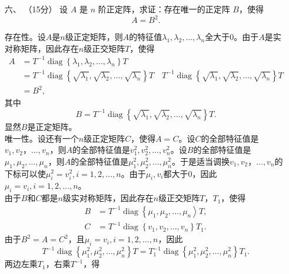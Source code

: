\begin{enumerate}[1~]
\item[六、]（15分）
设 $A$ 是 $n$ 阶正定阵，求证：存在唯一的正定阵 $B$，使得\[
A = B ^ { 2 }.
\]
\begin{solution}
存在性。设$A$是$n$级正定矩阵，则$A$的特征值$\lambda_1, \lambda_2, \dots, \lambda_n$全大于0。由于$A$是实对称矩阵，因此存在$n$级正交矩阵$T$，使得
\begin{align*} 
A & = T ^ { - 1 } \operatorname { diag } \left\{ \lambda _ { 1 } , \lambda _ { 2 } , \dots , \lambda _ { n } \right\} T \\ 
& = T ^ { - 1 } \operatorname { diag } \left\{ \sqrt { \lambda _ { 1 } } , \sqrt { \lambda _ { 2 } } , \dots , \sqrt { \lambda _ { n } } \right\} T \quad T ^ { - 1 } \operatorname { diag } \left\{ \sqrt { \lambda _ { 1 } } , \sqrt { \lambda _ { 2 } } , \dots , \sqrt { \lambda _ { n } } \right\} T \\ 
& = B ^ { 2 },
 \end{align*}
其中\[
B = T ^ { - 1 } \operatorname { diag } \left\{ \sqrt { \lambda _ { 1 } } , \sqrt { \lambda _ { 2 } } , \dots , \sqrt { \lambda _ { n } } \right\} T.
\]
显然$B$是正定矩阵。\\
唯一性。设还有一个$n$级正定矩阵$C$，使得$A=C$。设$C$的全部特征值是$v_1, v_2，\dots, v_n$，则$A$的全部特征值是$v_ { 1 }^2 , v_ { 2 }^2 , \dots , v_ { n }^2$。设$B$的全部特征值是$\mu _ { 1 } , \mu _ { 2 } , \dots , \mu _ { n }$，则$A$的全部特征值是$\mu _ { 1 } ^ { 2 } , \mu _ { 2 } ^ { 2 } , \dots  , \mu _ { n } ^ { 2 }$。于是适当调换$v_1, v_2，\dots, v_n$的下标可以使$\mu _ { i } ^ { 2 } = v _ { i } ^ { 2 } , i = 1,2 , \dots, n$。由于$\mu_i, v_i$都大于0，因此$\mu_i=v_i, i=1, 2, \dots,n$。\\
由于$B$和$C$都是$n$级实对称矩阵，因此存在$n$级正交矩阵$T$，$T_1$，使得\begin{align*}
 B & = T ^ { - 1 } \operatorname { diag } \left\{ \mu _ { 1 } , \mu _ { 2 } , \dots , \mu _ { n } \right\rangle T, \\ C & = T ^ { - 1 } \operatorname { diag } \left\{ v _ { 1 } , v _ { 2 } , \dots , v _ { n } \right\} T _ { 1 }. \end{align*}
由于$B^2=A=C^2$，且$\mu _ { i } = v _ { i } , i = 1,2 , \dots , n$，因此\[
T ^ { - 1 } \operatorname { diag } \left\{ \mu _ { 1 } ^ { 2 } , \mu _ { 2 } ^ { 2 } , \dots , \mu _ { n } ^ { 2 } \right\} T = T _ { 1 } ^ { - 1 } \operatorname { diag } \left\{ \mu _ { 1 } ^ { 2 } , \mu _ { 2 } ^ { 2 } , \dots , \mu _ { n } ^ { 2 } \right\} T _ { 1 }.
\]
两边左乘$T_1$，右乘$T^{-1}$，得\begin{equation}\label{T1Tmu}

\end{equation}
\end{solution}
\end{enumerate}
